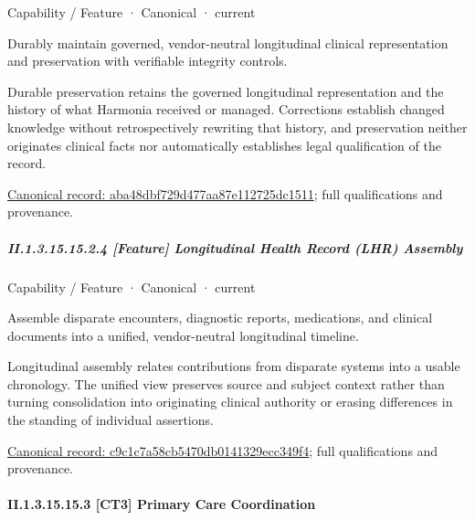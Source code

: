 \label{element:aba48dbf729d477aa87e112725dc1511}
{\small Capability / Feature · Canonical · current}\par

Durably maintain governed, vendor-neutral longitudinal clinical representation and preservation with verifiable integrity controls.



Durable preservation retains the governed longitudinal representation and the history of what Harmonia received or managed. Corrections establish changed knowledge without retrospectively rewriting that history, and preservation neither originates clinical facts nor automatically establishes legal qualification of the record.


{\footnotesize \href{../../../../continuum/strategy/capability/feature/aba48dbf729d477aa87e112725dc1511.md}{Canonical record: aba48dbf729d477aa87e112725dc1511}; full qualifications and provenance.}\par
\subparagraph*{II.1.3.15.15.2.4 [Feature] Longitudinal Health Record (LHR) Assembly}
\label{navigation:II.1.3.15.15.2.4}

\label{element:c9c1c7a58cb5470db0141329ecc349f4}
{\small Capability / Feature · Canonical · current}\par

Assemble disparate encounters, diagnostic reports, medications, and clinical documents into a unified, vendor-neutral longitudinal timeline.



Longitudinal assembly relates contributions from disparate systems into a usable chronology. The unified view preserves source and subject context rather than turning consolidation into originating clinical authority or erasing differences in the standing of individual assertions.


{\footnotesize \href{../../../../continuum/strategy/capability/feature/c9c1c7a58cb5470db0141329ecc349f4.md}{Canonical record: c9c1c7a58cb5470db0141329ecc349f4}; full qualifications and provenance.}\par
\paragraph*{II.1.3.15.15.3 [CT3] Primary Care Coordination}
\label{navigation:II.1.3.15.15.3}

